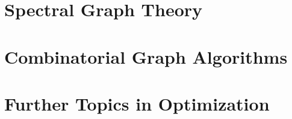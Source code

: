 \documentclass[12pt,a4paper,openany]{book}
\begin{document}
\part{Spectral Graph Theory}
\label{part:sg}










\part{Combinatorial Graph Algorithms}
\label{part:combinatorial}






\part{Further Topics in Optimization}






\end{document}
